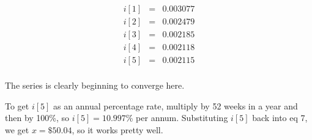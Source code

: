 \begin{eqnarray*}
       i[1]&=&0.003077\\
       i[2]&=&0.002479\\
       i[3]&=&0.002185\\
       i[4]&=&0.002118\\
       i[5]&=&0.002115\\
\end{eqnarray*}

     The series is clearly beginning to converge here.

     To get $i[5]$ as an annual percentage rate, multiply by 52 weeks
     in a year and then by 100\%, so $i[5] = 10.997$\% per annum.
     Substituting $i[5]$ back into eq 7, we get $x = \$50.04$, so it
     works pretty well.

\Ref
 
